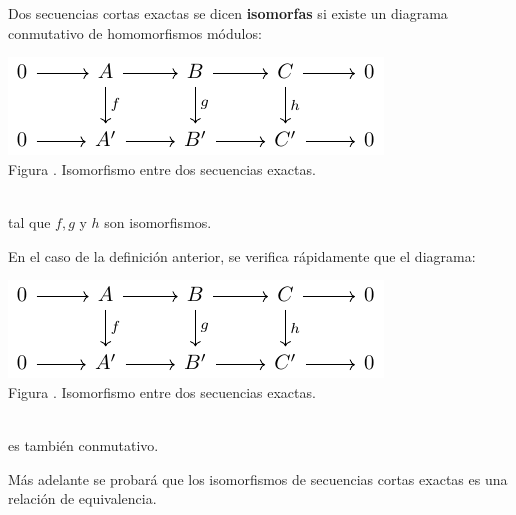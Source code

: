 \documentclass[12pt]{report}
\theoremstyle{largebreak}
\begin{document}
    \begin{mydef}
        Dos secuencias cortas exactas se dicen \textbf{isomorfas} si existe un diagrama conmutativo de homomorfismos módulos:
        
        \begin{minipage}{\textwidth}
            \begin{center}
                \includegraphics[scale=1.5]{images/fig_2.pdf}\\
                Figura \thefigcount. Isomorfismo entre dos secuencias exactas.
            \end{center}
        \end{minipage}
        \\

        tal que $f,g$ y $h$ son isomorfismos.
    \end{mydef}

    \begin{obs}
        En el caso de la definición anterior, se verifica rápidamente que el diagrama:

        \begin{minipage}{\textwidth}
            \begin{center}
                \includegraphics[scale=1.5]{images/fig_2.pdf}\\
                Figura \thefigcount. Isomorfismo entre dos secuencias exactas.
            \end{center}
        \end{minipage}
        \\

        es también conmutativo.
    \end{obs}

    Más adelante se probará que los isomorfismos de secuencias cortas exactas es una relación de equivalencia.
\end{document}
